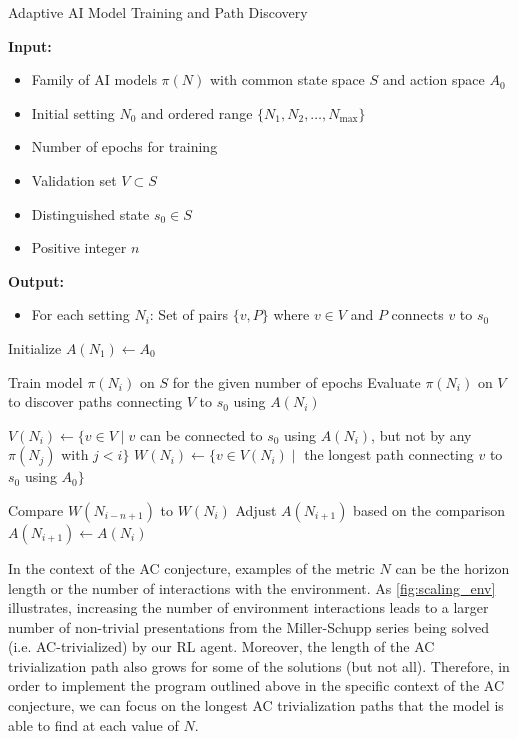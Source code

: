 \begin{algorithm}
	\caption{Adaptive AI Model Training and Path Discovery}
	\label{alg:adaptive_ai_model}
	\begin{algorithmic}[1]
		\State \textbf{Input:}
		\begin{itemize}
			\item[] Family of AI models $\pi(N)$ with common state space $S$ and action space $A_0$
			\item[] Initial setting $N_0$ and ordered range $\{N_1, N_2, \ldots, N_{\text{max}}\}$
			\item[] Number of epochs for training
			\item[] Validation set $V \subset S$
			\item[] Distinguished state $s_0 \in S$
			\item[] Positive integer $n$
		\end{itemize}
		
		\State \textbf{Output:}
		\begin{itemize}
			\item[] For each setting $N_i$: Set of pairs $\{v, P\}$ where $v \in V$ and $P$ connects $v$ to $s_0$
		\end{itemize}
		
		\State Initialize $A(N_1) \gets A_0$
		
		\State Train model $\pi(N_i)$ on $S$ for the given number of epochs
		\State Evaluate $\pi(N_i)$ on $V$ to discover paths connecting $V$ to $s_0$ using $A(N_i)$
		
		\State $V(N_i) \gets \{ v \in V \mid v$ can be connected to $s_0$ using $A(N_i)$, but not by any $\pi(N_j)$ with $j < i\}$
		\State $W(N_i) \gets \{ v \in V(N_i) \mid$ the longest path connecting $v$ to $s_0$ using $A_0 \}$
		
		\State Compare $W(N_{i-n+1})$ to $W(N_i)$
		\State Adjust $A(N_{i+1})$ based on the comparison
		\Else
		\State $A(N_{i+1}) \gets A(N_i)$
		\EndIf
		\EndFor
	\end{algorithmic}
\end{algorithm}

In the context of the AC conjecture, examples of the metric $N$ can be the horizon length or the number of interactions with the environment. As \autoref{fig:scaling_env} illustrates, increasing the number of environment interactions leads to a larger number of non-trivial presentations from the Miller-Schupp series being solved (i.e. AC-trivialized) by our RL agent. Moreover, the length of the AC trivialization path also grows for some of the solutions (but not all).
%
Therefore, in order to implement the program outlined above in the specific context of the AC conjecture, we can focus on the longest AC trivialization paths that the model is able to find at each value of $N$.

